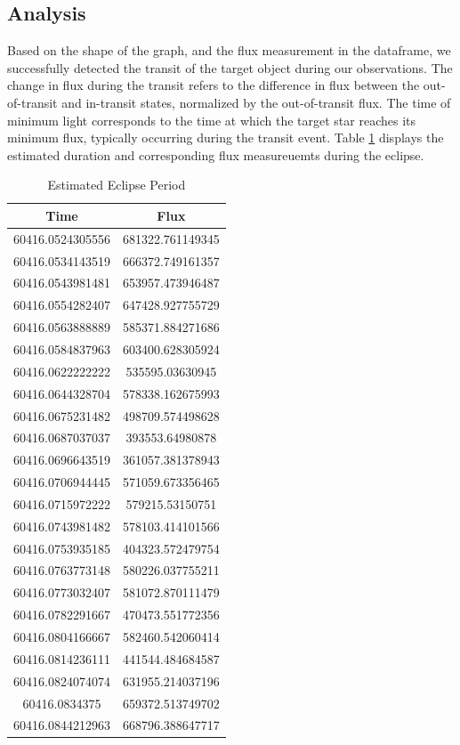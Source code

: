 \documentclass[]{aastex63}
\begin{document}
\subsection{Analysis}
Based on the shape of the graph, and the flux measurement in the dataframe, we successfully detected the transit of the target object during our observations. The change in flux during the transit refers to the difference in flux between the out-of-transit and in-transit states, normalized by the out-of-transit flux. The time of minimum light corresponds to the time at which the target star reaches its minimum flux, typically occurring during the transit event. Table \ref{tab:eclipse_period} displays the estimated duration and corresponding flux measureuemts during the eclipse.

\begin{table}[htbp]
\centering
\caption{Estimated Eclipse Period}
\label{tab:eclipse_period}
\begin{tabular}{|c|c|}
\hline
Time & Flux \\
\hline
60416.0524305556 & 681322.761149345 \\
60416.0534143519 & 666372.749161357 \\
60416.0543981481 & 653957.473946487 \\
60416.0554282407 & 647428.927755729 \\
60416.0563888889 & 585371.884271686 \\
60416.0584837963 & 603400.628305924 \\
60416.0622222222 & 535595.03630945 \\
60416.0644328704 & 578338.162675993 \\
60416.0675231482 & 498709.574498628 \\
60416.0687037037 & 393553.64980878 \\
60416.0696643519 & 361057.381378943 \\
60416.0706944445 & 571059.673356465 \\
60416.0715972222 & 579215.53150751 \\
60416.0743981482 & 578103.414101566 \\
60416.0753935185 & 404323.572479754 \\
60416.0763773148 & 580226.037755211 \\
60416.0773032407 & 581072.870111479 \\
60416.0782291667 & 470473.551772356 \\
60416.0804166667 & 582460.542060414 \\
60416.0814236111 & 441544.484684587 \\
60416.0824074074 & 631955.214037196 \\
60416.0834375 & 659372.513749702 \\
60416.0844212963 & 668796.388647717 \\
\hline
\end{tabular}
\end{table}
\end{document}
